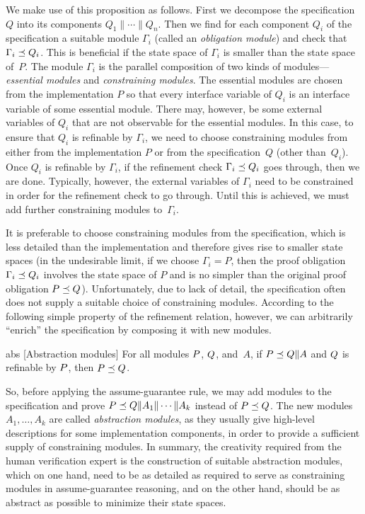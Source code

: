 \mypar
\noindent
We make use of this proposition as follows.  First we decompose the
specification $Q$ into its components $Q_1 \| \cdots \| Q_n$.  Then we find for
each component $Q_i$ of the specification a suitable module $\Gamma_i$
(called an {\em obligation module}) and check that $\Gamma_i\preceq Q_i$.
This is beneficial if the state space of $\Gamma_i$ is smaller than the state
space of~$P$.  The module $\Gamma_i$ is the parallel composition of two kinds
of modules---{\em essential modules\/} and {\em constraining modules}.  The
essential modules are chosen from the implementation $P$ so that every
interface variable of $Q_i$ is an interface variable of some essential
module.  There may, however, be some external variables of $Q_i$ that are not
observable for the essential modules.  In this case, to ensure that $Q_i$ is
refinable by $\Gamma_i$, we need to choose constraining modules from either
from the implementation $P$ or from the specification~$Q$ (other than~$Q_i$).
Once $Q_i$ is refinable by $\Gamma_i$, if the refinement check
$\Gamma_i\preceq Q_i$ goes through, then we are done.  Typically, however,
the external variables of $\Gamma_i$ need to be constrained in order for the
refinement check to go through.  Until this is achieved, we must add further
constraining modules to~$\Gamma_i$.

\mypar
It is preferable to choose constraining modules from the specification, which
is less detailed than the implementation and therefore gives rise to smaller
state spaces (in the undesirable limit, if we choose $\Gamma_i=P$, then the
proof obligation $\Gamma_i\preceq Q_i$ involves the state space of $P$ and
is no simpler than the original proof obligation $P\preceq Q$).
Unfortunately, due to lack of detail, the specification often does not supply
a suitable choice of constraining modules.  According to the following simple
property of the refinement relation, however, we can arbitrarily ``enrich''
the specification by composing it with new modules.

\begin{proposition}{abs}
  [Abstraction modules]
  For all modules ${P}$, ${Q}$, and~$A$,
  if ${P}\preceq{Q}\|A$ and ${Q}$ is refinable by ${P}$, then
  ${P}\preceq{Q}$. 
\end{proposition}

\mypar
\noindent
So, before applying the assume-guarantee rule, we may add modules to the
specification and prove $P\preceq Q\|A_1\|\cdots\|A_k$ instead of $P\preceq
Q$.  The new modules $A_1,\ldots,A_k$ are called {\em abstraction modules},
as they usually give high-level descriptions for some implementation
components, in order to provide a sufficient supply of constraining modules.
In summary, the creativity required from the human verification expert is the
construction of suitable abstraction modules, which on one hand, need to be
as detailed as required to serve as constraining modules in assume-guarantee
reasoning, and on the other hand, should be as abstract as possible to
minimize their state spaces.

